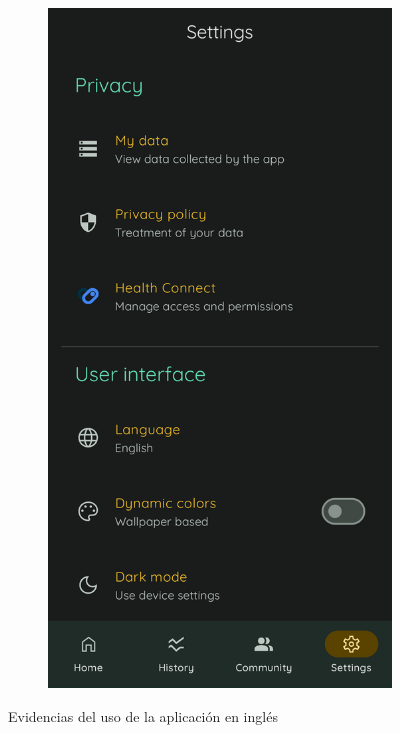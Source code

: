 \begin{figure}[htbp]
\begin{subfigure}[c]{0.4\textwidth}
                \end{subfigure}
                \hspace{0.1\textwidth}
                \begin{subfigure}[c]{0.4\textwidth}
                    \centering
                    \includegraphics[width=1\linewidth]{figures/pruebas/ingles/Ingles.png}
                \end{subfigure}
                \caption{Evidencias del uso de la aplicación en inglés}
                \label{figure:pruebas:app_ingles}
            \end{figure}
            

